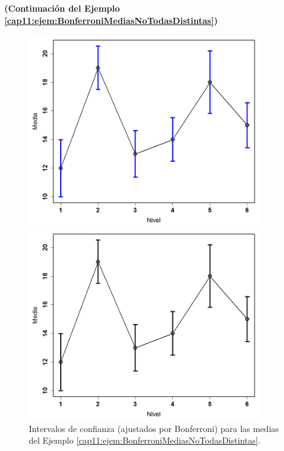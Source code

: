 \begin{ejemplo}{\bf (Continuación del Ejemplo \ref{cap11:ejem:BonferroniMediasNoTodasDistintas})}
\begin{figure}[htbp]
\begin{center}
\begin{enColor}
\includegraphics[width=10cm]{../fig/Cap11-BonferroniMediasNoTodasDistintasIntervalosConfianza.png}
\end{enColor}
\begin{bn}
\includegraphics[width=10cm]{../fig/Cap11-BonferroniMediasNoTodasDistintasIntervalosConfianza-bn.png}
\end{bn}
\caption{Intervalos de confianza (ajustados por Bonferroni) para las medias del Ejemplo \ref{cap11:ejem:BonferroniMediasNoTodasDistintas}.}
\label{cap11:fig:BonferroniMediasNoTodasDistintasIntervalosGrupos}
\end{center}
\end{figure}


\end{ejemplo}
